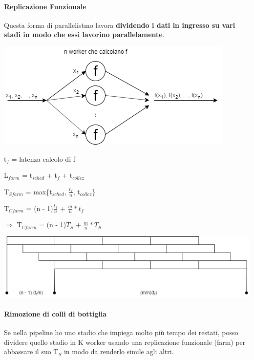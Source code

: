 \documentclass[10pt]{report}
\begin{document}
\paragraph{Replicazione Funzionale} Questa forma di parallelistmo lavora \textbf{dividendo i dati in ingresso su vari stadi in modo che essi lavorino parallelamente}.
\begin{center}
	\includegraphics[scale=1]{farm.png}
\end{center}
\begin{multicols}{2}
\begin{list}{}{}
	\item t$_f$ = latenza calcolo di f
	\item L$_{farm}$ = t$_{sched}$ + t$_f$ + t$_{collez}$
	\item T$_{Sfarm}$ = max\{t$_{sched}$, $\frac{t_f}{n}$, t$_{collez}$\}
	\item T$_{Cfarm}$ = (n - 1)$\frac{t_f}{n}$ + $\frac{m}{n} * t_f$
	\item $\Rightarrow$ T$_{Cfarm}$ = (n - 1)$T_S$ + $\frac{m}{n} * T_S$
\end{list}
	\includegraphics[scale=0.43]{farmgraph.png}
\end{multicols}
\paragraph{Rimozione di colli di bottiglia} Se nella pipeline ho uno stadio che impiega molto più tempo dei restati, posso dividere quello stadio in K worker usando una replicazione funzionale (farm) per abbassare il suo T$_S$ in modo da renderlo simile agli altri.
\pagebreak
\end{document}
